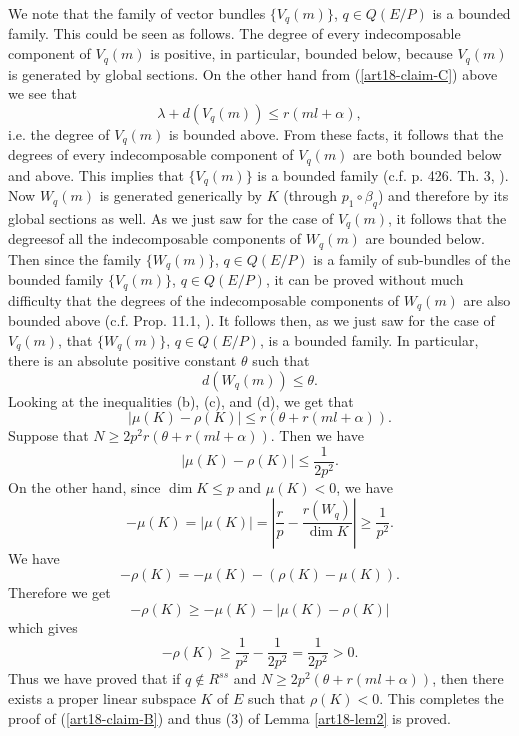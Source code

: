We note that the family of vector bundles $\{V_{q}(m)\}$, $q\in Q(E/P)$ is a bounded family. This could be seen as follows. The degree of every indecomposable component of $V_{q}(m)$ is positive, in particular, bounded below, because $V_{q}(m)$ is generated by global sections. On the other hand from (\ref{art18-claim-C}) above we see that
$$
\lambda+d(V_{q}(m))\leq r(ml+\alpha),
$$
i.e. the degree of $V_{q}(m)$ is bounded above. From these facts, it follows that the degrees of every indecomposable component of $V_{q}(m)$ are both bounded below and above. This implies that $\{V_{q}(m)\}$ is a bounded family (c.f. p. 426. Th. 3, \cite{art18-key1}). Now $W_{q}(m)$ is generated generically by $K$ (through $p_{1}\circ \beta_{q}$) and therefore by its global sections as well. As we just saw for the case of $V_{q}(m)$, it follows that the degrees\pageoriginale of all the indecomposable components of $W_{q}(m)$ are bounded below. Then since the family $\{W_{q}(m)\}$, $q\in Q(E/P)$ is a family of sub-bundles of the bounded family $\{V_{q}(m)\}$, $q\in Q(E/P)$, it can be proved without much difficulty that the degrees of the indecomposable components of $W_{q}(m)$ are also bounded above (c.f. Prop. 11.1, \cite{art18-key11}). It follows then, as we just saw for the case of $V_{q}(m)$, that $\{W_{q}(m)\}$, $q\in Q(E/P)$, is a bounded family. In particular, there is an absolute positive constant $\theta$ such that
$$
d(W_{q}(m))\leq \theta.
$$
Looking at the inequalities (b), (c), and (d), we get that
$$
|\mu(K)-\rho(K)|\leq r(\theta+r(ml+\alpha)).
$$
Suppose that $N\geq 2p^{2}r(\theta+r(ml+\alpha))$. Then we have
$$
|\mu (K)-\rho(K)|\leq \dfrac{1}{2p^{2}}.
$$
On the other hand, since $\dim K\leq p$ and $\mu(K)<0$, we have
$$
-\mu(K)=|\mu(K)|=\left|\dfrac{r}{p}-\dfrac{r(W_{q})}{\dim K}\right|\geq \dfrac{1}{p^{2}}.
$$
We have
$$
-\rho(K)=-\mu(K)-(\rho(K)-\mu(K)).
$$
Therefore we get
$$
-\rho(K)\geq -\mu(K)-|\mu(K)-\rho(K)|
$$
which gives
$$
-\rho(K)\geq \dfrac{1}{p^{2}}-\dfrac{1}{2p^{2}}=\dfrac{1}{2p^{2}}>0.
$$
Thus we have proved that if $q\not\in R^{ss}$ and $N\geq 2p^{2}(\theta+r(ml+\alpha))$, then there exists a proper linear subspace $K$ of $E$ such that $\rho(K)<0$. This completes the proof of (\ref{art18-claim-B}) and thus (3) of Lemma \ref{art18-lem2} is proved.

